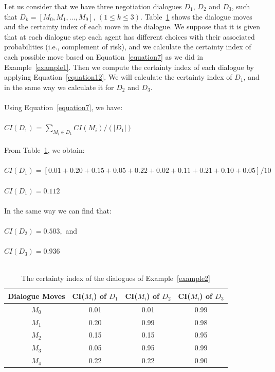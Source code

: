 \begin{example}\label{example2}
Let us consider that we have three negotiation dialogues $D_1$, $D_2$ and $D_3$, such that $D_k={[M_0, M_1,\ldots, M_9]}$, $(1
\leq k \leq 3)$. Table~\ref{Table2} shows the dialogue moves and the certainty index of each move in the dialogue. We suppose that
it is given that at each dialogue step each agent has different choices with their associated probabilities (i.e., complement of
risk), and we calculate the certainty index of each possible move based on Equation~\ref{equation7} as we did in
Example~\ref{example1}. Then we compute the certainty index of each dialogue by applying Equation~\ref{equation12}. We will
calculate the certainty index of $D_1$, and in the same way we calculate it for $D_2$ and $D_3$.
%
\\\\Using Equation~\ref{equation7}, we have:\\
\\$CI(D_1)$ = $\sum_{M_{i}\in D_{1}} CI(M_i)/(|D_1|)$\\
\\From Table~\ref{Table2}, we obtain:\\
\\$CI(D_1) = [0.01+0.20+0.15+0.05+0.22+0.02+0.11+0.21+0.10+0.05]/10$\\
\\$CI(D_1) = 0.112 $\\
\\In the same way we can find that:\\
 \\$CI(D_2) = 0.503, $  and \\
 \\$CI(D_3) = 0.936 $\\\\
%
\begin{table}[tbp]
\centering \caption{The certainty index of the dialogues of Example~\ref{example2}} \label{Table2}
\begin{tabular}{cccc}\hline
\textbf{Dialogue Moves}&\textbf{CI($M_i$) of $D_1$}&\textbf{CI($M_i$) of $D_2$}&\textbf{CI($M_i$) of $D_3$}\\
\hline
   {$M_0$} & {0.01} & {0.01} & {0.99} \\
   {$M_1$} & {0.20} & {0.99} & {0.98} \\
   {$M_2$} & {0.15} & {0.15} & {0.95} \\
   {$M_3$} & {0.05} & {0.95} & {0.99} \\
   {$M_4$} & {0.22} & {0.22} & {0.90} \\

\end{tabular}
\end{table}
\end{example}

